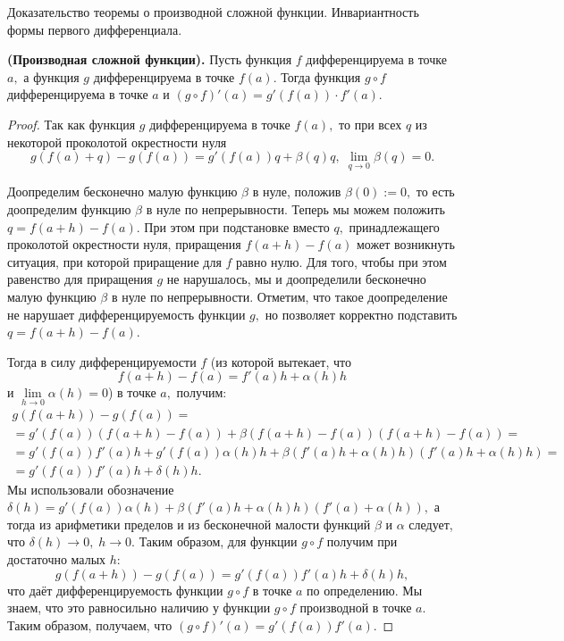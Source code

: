 \begin{problem}
Доказательство теоремы о производной сложной функции. Инвариантность формы
первого дифференциала.
\end{problem}
\begin{proposition}
    \textbf{(Производная сложной функции).}
    Пусть функция $f$ дифференцируема в точке
    $a,$ а функция $g$ дифференцируема в точке
    $f(a).$ Тогда функция $g\circ f$ дифференцируема
    в точке $a$ и $(g\circ f)'(a)=g'(f(a))\cdot f'(a).$
\end{proposition}
\begin{proof}
    Так как функция $g$ дифференцируема в точке
    $f(a),$ то при всех $q$ из некоторой
    проколотой окрестности нуля
    $$
        g(f(a)+q)-g(f(a))=g'(f(a))q+\beta(q)q,\;
        \lim\limits_{q\rightarrow0}\beta(q)=0.
    $$

    Доопределим бесконечно малую функцию
    $\beta$ в нуле, положив $\beta(0):=0,$
    то есть доопределим функцию $\beta$
    в нуле по непрерывности.
    Теперь мы можем положить
    $q=f(a+h)-f(a).$
    При этом при подстановке вместо
    $q,$ принадлежащего
    проколотой окрестности нуля,
    приращения $f(a+h)-f(a)$ может возникнуть
    ситуация, при которой приращение
    для $f$ равно нулю. Для того, чтобы
    при этом равенство для приращения $g$
    не нарушалось, мы и
    доопределили бесконечно малую функцию
    $\beta$ в нуле по непрерывности.
    Отметим, что такое доопределение не
    нарушает дифференцируемость функции $g,$
    но позволяет корректно подставить
    $q=f(a+h)-f(a).$

    Тогда
    в силу дифференцируемости $f$
    (из которой вытекает, что $$f(a+h)-f(a)=
        f'(a)h+\alpha(h)h$$ и
    $\lim\limits_{h\rightarrow0}\alpha(h)=0$)
    в точке $a,$ получим:
    \begin{multline*}
        g(f(a+h))-g(f(a))=\\
        =g'(f(a))(f(a+h)-f(a))+
        \beta(f(a+h)-f(a))(f(a+h)-f(a))=\\=
        g'(f(a))f'(a)h+g'(f(a))\alpha(h)h+
        \beta(f'(a)h+\alpha(h)h)(f'(a)h+\alpha(h)h)=\\
        =g'(f(a))f'(a)h+\delta(h)h.
    \end{multline*}
    Мы использовали обозначение
    $\delta(h)=g'(f(a))\alpha(h)+
        \beta(f'(a)h+\alpha(h)h)(f'(a)+\alpha(h)),$
    а тогда из арифметики пределов и из
    бесконечной малости функций $\beta$
    и $\alpha$ следует, что $\delta(h)
        \rightarrow0,\;h\rightarrow0.$
    Таким образом, для функции $g\circ f$
    получим при достаточно малых $h:$
    $$
        g(f(a+h))-g(f(a))=
        g'(f(a))f'(a)h+\delta(h)h,
    $$
    что даёт дифференцируемость
    функции $g\circ f$ в точке $a$ по определению.
    Мы знаем, что это равносильно
    наличию у функции $g\circ f$ производной
    в точке $a.$ Таким образом, получаем,
    что $(g\circ f)'(a)=
        g'(f(a))f'(a).$
\end{proof}
